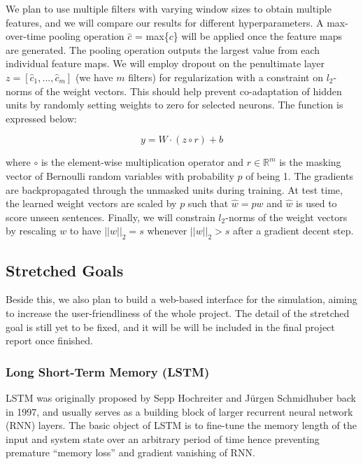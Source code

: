 \documentclass[conference]{IEEEtran}
\begin{document}
    We plan to use multiple filters with varying window sizes to obtain multiple features, and we will
    compare our results for different hyperparameters.
    A max-over-time pooling operation $\hat{c}$ = max\{$c$\} will be applied once the feature
    maps are generated. The pooling operation outputs the largest value from each individual
    feature maps. We will employ dropout on the penultimate layer $z = [\hat{c}_1,...,\hat{c}_m]$
    (we have $m$ filters) for regularization with a constraint on $l_2$-norms of the weight
    vectors. This should help prevent co-adaptation of hidden units by randomly setting weights
    to zero for selected neurons. The function is expressed below:

    \begin{equation}
    y = W \cdot (z \circ r) + b
    \end{equation}

    where $\circ$ is the element-wise multiplication operator and $r \in \mathbb{R}^m$ is
    the masking vector of Bernoulli random variables with probability $p$ of being 1.
    The gradients are backpropagated through the unmasked units during training. At test
    time, the learned weight vectors are scaled by $p$ such that $\hat{w} = pw$ and $\hat{w}$
    is used to score unseen sentences. Finally, we will constrain $l_2$-norms of the weight
    vectors by rescaling $w$ to have $||w||_2 = s$ whenever $||w||_2 > s$ after a gradient
    decent step.

\subsection{Stretched Goals}
\label{model:stretch}
    
    Beside this, we also plan to build a web-based interface for the simulation, aiming
    to increase the user-friendliness of the whole project. The detail of the stretched
    goal is still yet to be fixed, and it will be will be included in the final project
    report once finished. 

\subsubsection{Long Short-Term Memory (LSTM)}
\label{model:stretch:lstm}
    LSTM was originally proposed by Sepp Hochreiter and J\"urgen Schmidhuber back in 
    1997\cite{hochreiter1997long}, and usually serves as a building block of larger
    recurrent neural network (RNN) layers. The basic object of LSTM is to fine-tune
    the memory length of the input and system state over an arbitrary period of time
    hence preventing premature ``memory loss'' and gradient vanishing of RNN.
    
\end{document}
